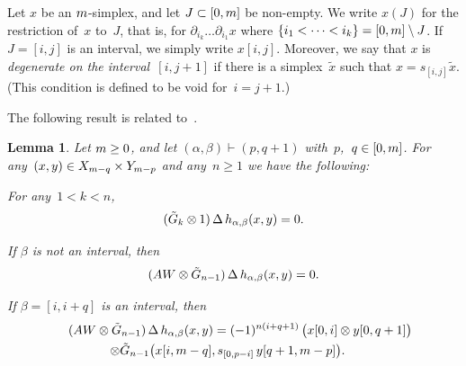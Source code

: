 \documentclass[letterpaper]{amsart}
\numberwithin{equation}{section}
\theoremstyle{plain}
\newtheorem{lemma}[theorem]{Lemma}
\theoremstyle{definition}
\theoremstyle{remark}
\let\newterm\emph
\def\AW{AW}
\def\restr#1#2#3{#1[#2,#3]}
\begin{document}
Let $x$ be an $m$-simplex,
and let $J\subset[0,m]$ be non-empty.
We write $x(J)$ for the restriction of~$x$ to~$J$, that is,
for $\partial_{i_{k}}\dots\partial_{i_{1}}x$ where $\{i_{1}<\dots<i_{k}\} = [0,m]\setminus J$.
If $J=[i,j]$ is an interval, we simply write $\restr{x}{i}{j}$.
Moreover, we say that $x$ is \newterm{degenerate on the interval~$[i,j+1]$} if there is a simplex~$\tilde{x}$
such that $x=s_{[i,j]}\tilde{x}$. (This condition is defined to be void for~$i=j+1$.)

The following result is related to~\cite[Thm.~5.1, Lemma~5.4]{HessEtAl:2006}.

\def\si{i}

\begin{lemma}
  \label{thm:GkGl}
  Let $m\ge0$, and let $(\alpha,\beta)\vdash(p,q+1)$ with~$p$,~$q\in[0,m]$.
  For any~$(x,y)\in X_{m-q}\times Y_{m-p}$ and any~$n\ge1$ we have the following:
  \begin{enumroman}
  \item
    \label{thm:GkGl-1}
    For any~$1< k<n$,
    \begin{equation*}
      (\tilde G_{k}\otimes 1)\,\Delta\,h_{\alpha,\beta}(x,y) = 0.
    \end{equation*}
  \item
    \label{thm:GkGl-2}
    If $\beta$ is not an interval, then
    \begin{equation*}
      (\AW\otimes \GG_{n-1})\,\Delta\, h_{\alpha,\beta}(x,y) = 0.
    \end{equation*}
  \item
    \label{thm:GkGl-3}
    If $\beta=[\si,\si+q]$ is an interval, then
    \begin{multline*}
      \quad
      (\AW\otimes\GG_{n-1})\,\Delta\, h_{\alpha,\beta}(x,y) =  (-1)^{n(\si+q+1)}\,\bigl(\restr{x}{0}{\si} \otimes \restr{y}{0}{q+1}\bigr) \\
      \otimes \GG_{n-1}\bigl(\restr{x}{\si}{\n-q}, s_{[0,p-\si]}\,\restr{y}{q+1}{\n-p}\bigr).
      \quad
    \end{multline*}
  \end{enumroman}
\end{lemma}
\end{document}
